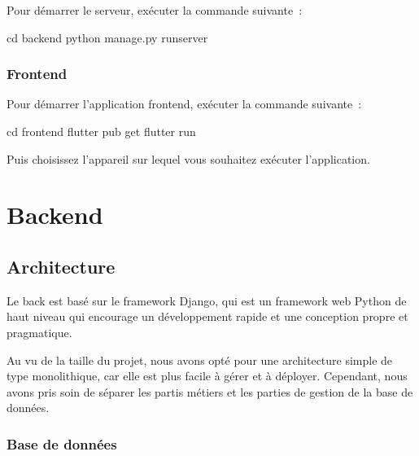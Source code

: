 \documentclass[
  12pt,
]{article}
\newenvironment{Shaded}{}{}
\newcommand{\BuiltInTok}[1]{\textcolor[rgb]{0.00,0.50,0.00}{#1}}
\newcommand{\ExtensionTok}[1]{#1}
\newcommand{\NormalTok}[1]{#1}
\begin{document}
Pour démarrer le serveur, exécuter la commande suivante~:

\begin{Shaded}
\begin{Highlighting}[]
\BuiltInTok{cd}\NormalTok{ backend}
\ExtensionTok{python}\NormalTok{ manage.py runserver}
\end{Highlighting}
\end{Shaded}

\subsubsection{Frontend}\label{frontend-1}

Pour démarrer l'application frontend, exécuter la commande suivante~:

\begin{Shaded}
\begin{Highlighting}[]
\BuiltInTok{cd}\NormalTok{ frontend}
\ExtensionTok{flutter}\NormalTok{ pub get}
\ExtensionTok{flutter}\NormalTok{ run}
\end{Highlighting}
\end{Shaded}

Puis choisissez l'appareil sur lequel vous souhaitez exécuter
l'application.

\section{Backend}\label{backend-2}

\subsection{Architecture}\label{architecture}

Le back est basé sur le framework Django, qui est un framework web
Python de haut niveau qui encourage un développement rapide et une
conception propre et pragmatique.

Au vu de la taille du projet, nous avons opté pour une architecture
simple de type monolithique, car elle est plus facile à gérer et à
déployer. Cependant, nous avons pris soin de séparer les partis métiers
et les parties de gestion de la base de données.

\subsubsection{Base de données}\label{base-de-donnuxe9es}
\end{document}
